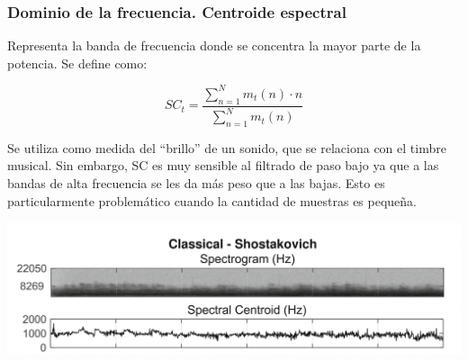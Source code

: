 \documentclass[
10pt, %
aspectratio=169, %
]{beamer}
\begin{document}
	\begin{frame}
		
		\frametitle{Dominio de la frecuencia. Centroide espectral}
		
		Representa la banda de frecuencia donde se concentra la mayor parte de la potencia. Se define como:  		
		
		$${SC}_t = \frac{\sum_{n=1}^{N} m_t(n) \cdot n}{\sum_{n=1}^{N} m_t(n)}$$
		
		Se utiliza como medida del ``brillo'' de un sonido, que se relaciona con el timbre musical. Sin embargo, SC es muy sensible al filtrado de paso bajo ya que a las bandas de alta frecuencia se les da más peso que a las bajas. Esto es particularmente problemático cuando la cantidad de muestras es pequeña.
		
		
		\centering
		\includegraphics[scale=0.45]{sc.png}
		
	\end{frame}
	
\end{document}
